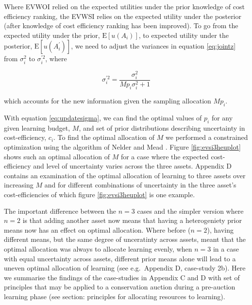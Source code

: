 \documentclass[]{article}
\theoremstyle{definition}
\theoremstyle{definition}
\theoremstyle{remark}
\begin{document}
Where EVWOI relied on the expected utilities under the prior knowledge
of cost efficiency ranking, the EVWSI relies on the expected utility
under the posterior (after knowledge of cost efficiency ranking has been
improved). To go from the expected utility under the prior,
\(\mathrm{E}[u(A_i)]\), to expected utility under the posterior,
\(\mathrm{E}[u(A^\prime_i)]\), we need to adjust the variances in
equation \eqref{eq:jointz} from \(\sigma^2_i\) to
\(\sigma^{\prime{}2}_i\), where

\begin{equation}
\sigma^{\prime{}2}_i = \frac{\sigma^2_i}{Mp_i\sigma^2_i + 1}
\label{eq:updatesigma}
\end{equation}

which accounts for the new information given the sampling allocation
\(Mp_i\).

With equation \eqref{eq:updatesigma}, we can find the optimal values of
\(p_i\) for any given learning budget, \(M\), and set of prior
distributions describing uncertainty in cost-efficiency, \(c_i\). To
find the optimal allocation of \(M\) we performed a constrained
optimization using the algorithm of Nelder and Mead
\citeyearpar{Nelder1965}. Figure \ref{fig:evsi3heuplot} shows such an
optimal allocation of \(M\) for a case where the expected
cost-efficiency and level of uncertainty varies across the three assets.
Appendix D contains an examination of the optimal allocation of learning
to three assets over increasing \(M\) and for different combinations of
uncertainty in the three asset's cost-efficiencies of which figure
\ref{fig:evsi3heuplot} is one example.

The important difference between the \(n=3\) cases and the simpler
version where \(n=2\) is that adding another asset now means that having
a heterogeniety prior means now has an effect on optimal allocation.
Where before (\(n=2\)), having different means, but the same degree of
unceratinty across assets, meant that the optimal allocation was always
to allocate learning evenly, when \(n=3\) in a case with equal
uncertainty across assets, different prior means alone will lead to a
uneven optimal allocation of learning (see e.g.~Appendix D, case-study
2b). Here we summarise the findings of the case-studies in Appendix C
and D with set of principles that may be applied to a conservation
auction during a pre-auction learning phase (see section: principles for
allocating resources to learning).
\end{document}
